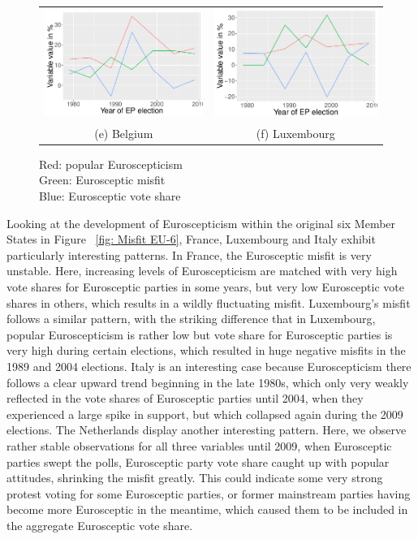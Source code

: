\begin{figure}
\begin{tabular}{cc}
	\includegraphics[width=65mm]{../../Analysis/Graphs/BE} & \includegraphics[width=65mm]{../../Analysis/Graphs/LU}	\\
	(e) Belgium & (f) Luxembourg \\[8pt]
\end{tabular}
\caption*{Red: popular Euroscepticism \\ Green: Eurosceptic misfit \\ Blue: Eurosceptic vote share}
\end{figure}
\pagebreak

Looking at the development of Euroscepticism within the original six Member States in Figure ~\ref{fig: Misfit EU-6}, France, Luxembourg and Italy exhibit particularly interesting patterns. In France, the Eurosceptic misfit is very unstable. Here, increasing levels of Euroscepticism are matched with very high vote shares for Eurosceptic parties in some years, but very low Eurosceptic vote shares in others, which results in a wildly fluctuating misfit. Luxembourg's misfit follows a similar pattern, with the striking difference that in Luxembourg, popular Euroscepticism is rather low but vote share for Eurosceptic parties is very high during certain elections, which resulted in huge negative misfits in the 1989 and 2004 elections. Italy is an interesting case because Euroscepticism there follows a clear upward trend beginning in the late 1980s, which only very weakly reflected in the vote shares of Eurosceptic parties until 2004, when they experienced a large spike in support, but which collapsed again during the 2009 elections. The Netherlands display another interesting pattern. Here, we observe rather stable observations for all three variables until 2009, when Eurosceptic parties swept the polls, Eurosceptic party vote share caught up with popular attitudes, shrinking the misfit greatly. This could indicate some very strong protest voting for some Eurosceptic parties, or former mainstream parties having become more Eurosceptic in the meantime, which caused them to be included in the aggregate Eurosceptic vote share. 

